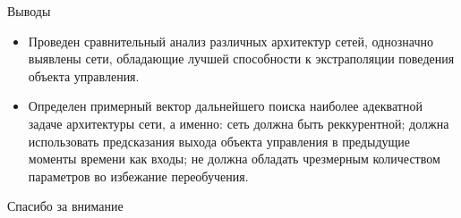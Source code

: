 \documentclass{beamer}
\begin{document}
\begin{frame}{Выводы}
\begin{itemize}
\item Проведен сравнительный анализ различных архитектур сетей, однозначно выявлены сети, обладающие лучшей способности к экстраполяции поведения объекта управления.
\item Определен примерный вектор дальнейшего поиска наиболее адекватной задаче архитектуры сети, а именно: сеть должна быть реккурентной; должна использовать предсказания выхода  объекта управления в предыдущие моменты времени как входы; не должна обладать чрезмерным количеством параметров во избежание переобучения.
\end{itemize}
\end{frame}

\begin{frame}
\centering
Спасибо за внимание
\end{frame}
\end{document}
